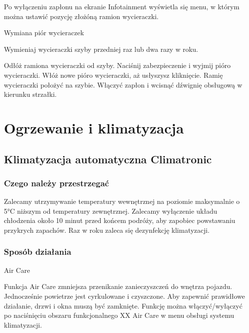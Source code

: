 Po wyłączeniu zapłonu na ekranie Infotainment wyświetla się menu, w którym można ustawić pozycję złożóną ramion wycieraczki.

Wymiana piór wycieraczek

Wymieniaj wycieraczki szyby przedniej raz lub dwa razy w roku.
\begin{itemizeArrow}
	\itemArrow Odłóż ramiona wycieraczki od szyby.
	\itemArrow Naciśnij zabezpieczenie i wyjmij pióro wycieraczki.
	\itemArrow Włóż nowe pióro wycieraczki, aż usłyszysz kliknięcie.
	\itemArrow Ramię wycieraczki położyć na szybie.
	\itemArrow Włączyć zapłon i wcisnąć dźwignię obsługową w kierunku strzałki.
\end{itemizeArrow}

\section{Ogrzewanie i klimatyzacja}

\subsection{Klimatyzacja automatyczna Climatronic}

\subsubsection{Czego należy przestrzegać}

\begin{itemizeTriangle}
	\itemTriangle Zalecamy utrzymywanie temperatury wewnętrznej na poziomie maksymalnie o 5°C niższym od temperatury zewnętrznej.
	\itemTriangle Zalecamy wyłączenie układu chłodzenia około 10 minut przed końcem podróży, aby zapobiec powstawaniu przykrych zapachów.
	\itemTriangle Raz w roku zaleca się dezynfekcję klimatyzacji.
\end{itemizeTriangle}

\subsubsection{Sposób działania}

Air Care

Funkcja Air Care zmniejsza przenikanie zanieczyszczeń do wnętrza pojazdu. Jednocześnie powietrze jest cyrkulowane i czyszczone.
Aby zapewnić prawidłowe działanie, drzwi i okna muszą być zamknięte.
Funkcję można włączyć/wyłączyć po naciśnięciu obszaru funkcjonalnego XX Air Care w menu obsługi systemu klimatyzacji.

